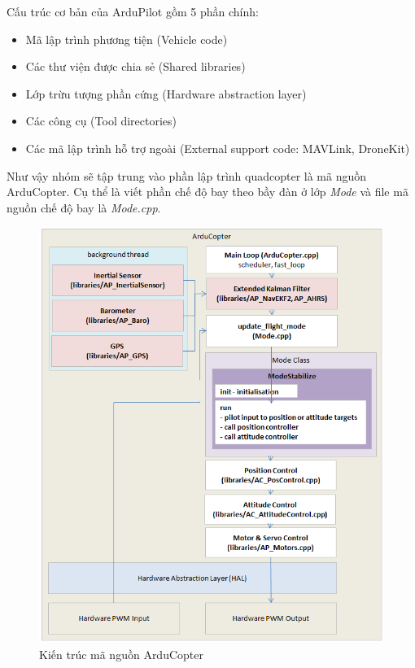 			Cấu trúc cơ bản của ArduPilot gồm 5 phần chính:
			\begin{itemize}
    	\item Mã lập trình phương tiện (Vehicle code)
    	\item Các thư viện được chia sẻ (Shared libraries)
    	\item Lớp trừu tượng phần cứng (Hardware abstraction layer)
    	\item Các công cụ (Tool directories)
    	\item Các mã lập trình hỗ trợ ngoài (External support code: MAVLink, DroneKit)
    		\end{itemize}
    		
    		Như vậy nhóm sẽ tập trung vào phần lập trình quadcopter là mã nguồn ArduCopter. Cụ thể là viết phần chế độ bay theo bầy đàn ở lớp \textit{Mode} và file mã nguồn chế độ bay là \textit{Mode.cpp}.
    		
    \begin{figure}[h!]
    	\begin{center}
    		\includegraphics[scale=0.6]{images/copter-architecture.png}
    		\caption{Kiến trúc mã nguồn ArduCopter}
    	\end{center}
    \end{figure}
    
